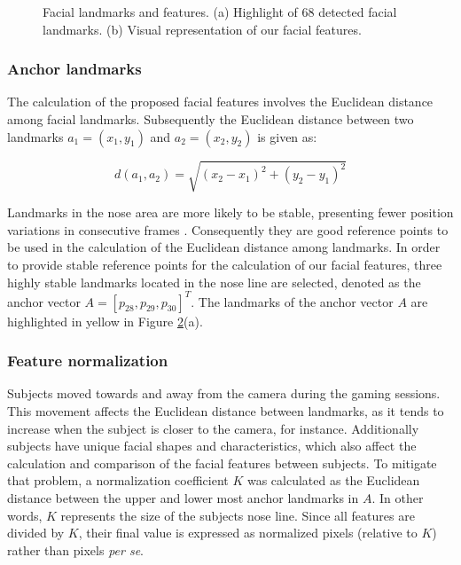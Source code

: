 \begin{figure}
\begin{subfigure}[b]{0.5\textwidth}
    \caption{}
    \label{fig:head-tilt}
  \end{subfigure}
  \caption{Facial landmarks and features. (a) Highlight of 68 detected facial landmarks. (b) Visual representation of our facial features.}
  \label{fig:faces}
\end{figure}


\subsubsection{Anchor landmarks}

The calculation of the proposed facial features involves the Euclidean distance among facial landmarks. Subsequently the Euclidean distance between two landmarks $a_1 = (x_1, y_1)$ and $a_2 = (x_2, y_2)$ is given as:

\[
d(a_1,a_2) = \sqrt{(x_2 - x_1)^2 + (y_2 - y_1)^2}
\]

Landmarks in the nose area are more likely to be stable, presenting fewer position variations in consecutive frames \parencite{giannakakis2017stress}. Consequently they are good reference points to be used in the calculation of the Euclidean distance among landmarks. In order to provide stable reference points for the calculation of our facial features, three highly stable landmarks located in the nose line are selected, denoted as the anchor vector $A = [p_{28}, p_{29}, p_{30}]^T$. The landmarks of the anchor vector $A$ are highlighted in yellow in Figure \ref{fig:faces}(a).

\subsubsection{Feature normalization}

Subjects moved towards and away from the camera during the gaming sessions. This movement affects the Euclidean distance between landmarks, as it tends to increase when the subject is closer to the camera, for instance. Additionally subjects have unique facial shapes and characteristics, which also affect the calculation and comparison of the facial features between subjects. To mitigate that problem, a normalization coefficient $K$ was calculated as the Euclidean distance between the upper and lower most anchor landmarks in $A$. In other words, $K$ represents the size of the subjects nose line. Since all features are divided by $K$, their final value is expressed as normalized pixels (relative to $K$) rather than pixels \textit{per se}.

